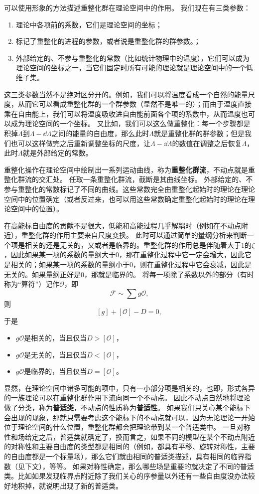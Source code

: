 \documentclass[hyperref, UTF8, a4paper]{ctexart}
\begin{document}
可以使用形象的方法描述重整化群在理论空间中的作用。
我们现在有三类参数：
\begin{enumerate}
    \item 理论中各项前的系数，它们是理论空间的坐标；
    \item 标记了重整化的进程的参数，或者说是重整化群的群参数。；
    \item 外部给定的、不参与重整化的常数（比如统计物理中的温度），它们可以成为理论空间的坐标之一，当它们固定时所有可能的理论就是理论空间中的一个低维子集。
\end{enumerate}
这三类参数当然不是绝对区分开的。例如，我们可以将温度看成一个自然的能量尺度，从而它可以看成重整化群的一个群参数（显然不是唯一的）；而由于温度直接乘在自由能上，我们可以将温度吸收进自由能前面各个项的系数中，从而温度也可以成为理论空间的一个坐标。
又比如，我们可以这么做重整化：每一个步骤都是积掉$\Lambda$到$\Lambda-\dd{\Lambda}$之间的能量的自由度，那么此时$\Lambda$就是重整化群的群参数；但是我们也可以这样做完之后重新调整坐标的尺度，让$\Lambda-\dd{\Lambda}$的数值在调整之后恢复$\Lambda$，此时$\Lambda$就是外部给定的常数。

重整化操作在理论空间中绘制出一系列运动曲线，称为\textbf{重整化群流}，不动点就是重整化群流的交汇处。
任取一条重整化群流，截断是其曲线坐标。
外部给定的、不参与重整化的常数标记了不同的曲线。这些常数完全由重整化起始时的理论在理论空间中的位置确定（或者反过来，也可以用这些常数确定重整化起始时的理论在理论空间中的位置）。

在高能标自由度的贡献不是很大，低能和高能过程几乎解耦时（例如在不动点附近），重整化群的作用主要来自尺度变换。
此时可以通过简单的量纲分析来判断一个项是相关的还是无关的，又或者是临界的。重整化群的作用总是伴随着大于1的$\zeta$，因此如果某一项的系数的量纲大于$0$，那在重整化过程中它一定会增大，因此它是相关的；如果某一项的系数的量纲小于$0$，则在重整化过程中它会衰减，因此是无关的。如果量纲正好是$0$，那就是临界的。
将每一项除了系数以外的部分（有时称为“算符”）记作$\mathcal{O}$，即
\[
    \mathcal{F} \sim \sum g \mathcal{O},
\]
则
\[
    [g] + [\mathcal{O}] - D = 0,
\]
于是
\begin{itemize}
    \item $g \mathcal{O}$是相关的，当且仅当$D > [\mathcal{O}]$，
    \item $g \mathcal{O}$是无关的，当且仅当$D < [\mathcal{O}]$，
    \item $g \mathcal{O}$是临界的，当且仅当$D = [\mathcal{O}]$。
\end{itemize}

显然，在理论空间中诸多可能的项中，只有一小部分项是相关的，也即，形式各异的一族理论可以在重整化群作用下流向同一个不动点。
因此不动点自然地将理论做了分类，称为\textbf{普适类}，不动点的性质称为\textbf{普适性}。
如果我们只关心某个能标下会出现的现象，那就只需要考虑这个能标下的不动点就可以，因为无论理论一开始位于理论空间的什么位置，重整化群都会把理论带到某一个普适类中。
一旦对称性和场给定之后，普适类就确定了，换而言之，如果不同的模型在某个不动点附近的对称性和主要自由度的类型都是相同的（例如，都具有平移、旋转对称性，主要的自由度都是一个标量场），那么它们就由相同的普适类描述，具有相同的临界指数（见下文），等等。
如果对称性确定，那么哪些场是重要的就决定了不同的普适类。比如如果发现临界点附近除了我们关心的序参量以外还有一些自由度没办法较好地积掉，就说明出现了新的普适类。
\end{document}
